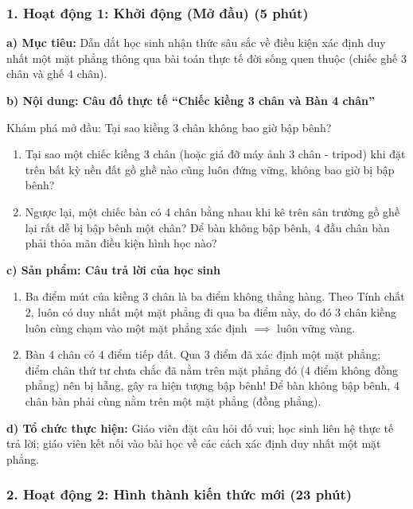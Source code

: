 \documentclass[12pt, a4paper]{article}
\begin{document}
\subsubsection*{1. Hoạt động 1: Khởi động (Mở đầu) (5 phút)}

\noindent \textbf{a) Mục tiêu:}
Dẫn dắt học sinh nhận thức sâu sắc về điều kiện xác định duy nhất một mặt phẳng thông qua bài toán thực tế đời sống quen thuộc (chiếc ghế 3 chân và ghế 4 chân).

\noindent \textbf{b) Nội dung: Câu đố thực tế ``Chiếc kiềng 3 chân và Bàn 4 chân''}
\begin{pedabox}{Khám phá mở đầu: Tại sao kiềng 3 chân không bao giờ bập bênh?}
\begin{enumerate}[leftmargin=0.6cm]
    \item Tại sao một chiếc kiềng 3 chân (hoặc giá đỡ máy ảnh 3 chân - tripod) khi đặt trên bất kỳ nền đất gồ ghề nào cũng luôn đứng vững, không bao giờ bị bập bênh?
    \item Ngược lại, một chiếc bàn có 4 chân bằng nhau khi kê trên sân trường gồ ghề lại rất dễ bị bập bênh một chân? Để bàn không bập bênh, 4 đầu chân bàn phải thỏa mãn điều kiện hình học nào?
\end{enumerate}
\end{pedabox}

\noindent \textbf{c) Sản phẩm: Câu trả lời của học sinh}
\begin{enumerate}[leftmargin=0.6cm]
    \item Ba điểm mút của kiềng 3 chân là ba điểm không thẳng hàng. Theo Tính chất 2, luôn có duy nhất một mặt phẳng đi qua ba điểm này, do đó 3 chân kiềng luôn cùng chạm vào một mặt phẳng xác định $\implies$ luôn vững vàng.
    \item Bàn 4 chân có 4 điểm tiếp đất. Qua 3 điểm đã xác định một mặt phẳng; điểm chân thứ tư chưa chắc đã nằm trên mặt phẳng đó (4 điểm không đồng phẳng) nên bị hẫng, gây ra hiện tượng bập bênh! Để bàn không bập bênh, 4 chân bàn phải cùng nằm trên một mặt phẳng (đồng phẳng).
\end{enumerate}

\noindent \textbf{d) Tổ chức thực hiện:}
Giáo viên đặt câu hỏi đố vui; học sinh liên hệ thực tế trả lời; giáo viên kết nối vào bài học về các cách xác định duy nhất một mặt phẳng.

\subsubsection*{2. Hoạt động 2: Hình thành kiến thức mới (23 phút)}
\end{document}
